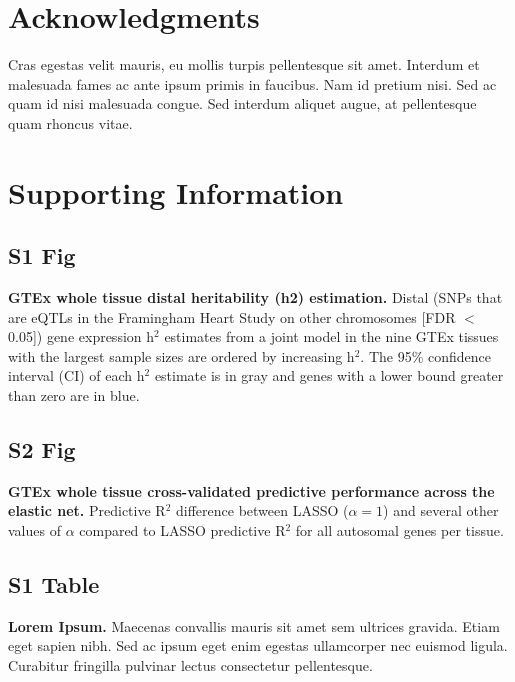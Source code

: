 \documentclass[10pt,letterpaper]{article}
\begin{document}
\section*{Acknowledgments}
Cras egestas velit mauris, eu mollis turpis pellentesque sit amet. Interdum et malesuada fames ac ante ipsum primis in faucibus. Nam id pretium nisi. Sed ac quam id nisi malesuada congue. Sed interdum aliquet augue, at pellentesque quam rhoncus vitae.

\nolinenumbers


%
%
% 



\section*{Supporting Information}


\subsection*{S1 Fig}
\label{S1_Fig}
{\bf GTEx whole tissue distal heritability (h2) estimation.} Distal (SNPs that are eQTLs in the Framingham Heart Study on other chromosomes [FDR $<$ 0.05]) gene expression h$^2$ estimates from a joint model in the nine GTEx tissues with the largest sample sizes are ordered by increasing h$^2$. The 95\% confidence interval (CI) of each h$^2$ estimate is in gray and genes with a lower bound greater than zero are in blue.

\subsection*{S2 Fig}
\label{S2_Fig}
{\bf GTEx whole tissue cross-validated predictive performance across the elastic net.} Predictive R$^2$ difference between LASSO ($\alpha = 1$) and several other values of $\alpha$ compared to LASSO predictive R$^2$ for all autosomal genes per tissue.

\subsection*{S1 Table}
\label{S1_Table}
{\bf Lorem Ipsum.} Maecenas convallis mauris sit amet sem ultrices gravida. Etiam eget sapien nibh. Sed ac ipsum eget enim egestas ullamcorper nec euismod ligula. Curabitur fringilla pulvinar lectus consectetur pellentesque.
\end{document}
